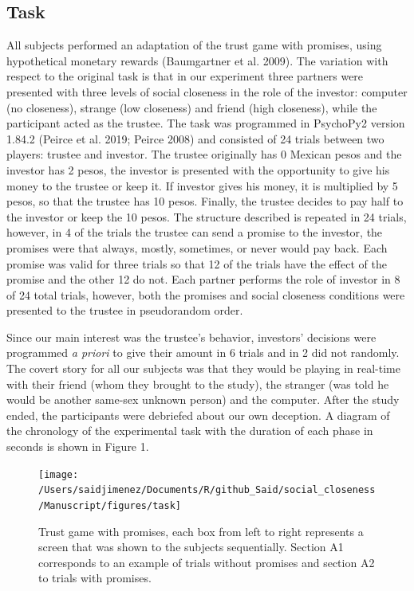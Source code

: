 \documentclass[smallextended]{svjour3}       %
\begin{document}
\hypertarget{task}{%
\subsection{Task}\label{task}}

All subjects performed an adaptation of the trust game with promises,
using hypothetical monetary rewards (Baumgartner et al. 2009). The
variation with respect to the original task is that in our experiment
three partners were presented with three levels of social closeness in
the role of the investor: computer (no closeness), strange (low
closeness) and friend (high closeness), while the participant acted as
the trustee. The task was programmed in PsychoPy2 version 1.84.2 (Peirce
et al. 2019; Peirce 2008) and consisted of 24 trials between two
players: trustee and investor. The trustee originally has 0 Mexican
pesos and the investor has 2 pesos, the investor is presented with the
opportunity to give his money to the trustee or keep it. If investor
gives his money, it is multiplied by 5 pesos, so that the trustee has 10
pesos. Finally, the trustee decides to pay half to the investor or keep
the 10 pesos. The structure described is repeated in 24 trials, however,
in 4 of the trials the trustee can send a promise to the investor, the
promises were that always, mostly, sometimes, or never would pay back.
Each promise was valid for three trials so that 12 of the trials have
the effect of the promise and the other 12 do not. Each partner performs
the role of investor in 8 of 24 total trials, however, both the promises
and social closeness conditions were presented to the trustee in
pseudorandom order.

Since our main interest was the trustee's behavior, investors' decisions
were programmed \emph{a priori} to give their amount in 6 trials and in
2 did not randomly. The covert story for all our subjects was that they
would be playing in real-time with their friend (whom they brought to
the study), the stranger (was told he would be another same-sex unknown
person) and the computer. After the study ended, the participants were
debriefed about our own deception. A diagram of the chronology of the
experimental task with the duration of each phase in seconds is shown in
Figure 1.

\begin{figure}

{\centering \texttt{[image: /Users/saidjimenez/Documents/R/github\_Said/social\_closeness/Manuscript/figures/task]} 

}

\caption{Trust game with promises, each box from left to right represents a screen that was shown to the subjects sequentially. Section A1 corresponds to an example of trials without promises and section A2 to trials with promises.}\label{fig:figA}
\end{figure}
\end{document}
